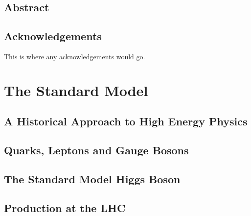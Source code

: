 \documentclass[oneside, letterpaper, 12pt, oldfontcommands]{memoir}
\begin{document}
\frontmatter


\thetitlepage
\clearpage

\thecopyrightpage
\cleardoublepage

\setcounter{page}{1}

\section{Abstract}
\uwabstract
\cleardoublepage

\section{Acknowledgements}
This is where any acknowledgements would go.
\clearpage

\tableofcontents* %
 \listoffigures*  %

\mainmatter

\chapter{The Standard Model}
\section{A Historical Approach to High Energy Physics}
\section{Quarks, Leptons and Gauge Bosons}
\section{The Standard Model Higgs Boson}
\section{\bbbar Production at the LHC}
\end{document}
